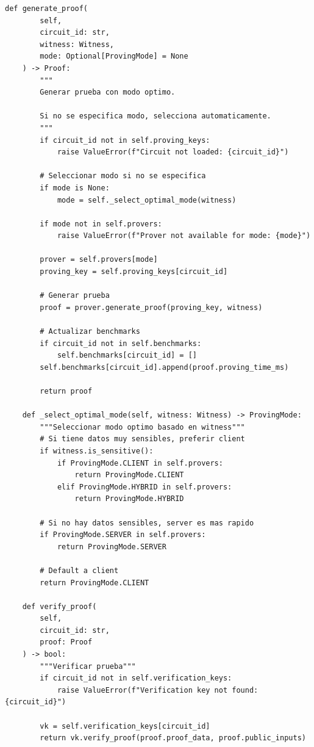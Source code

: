 \documentclass[11pt,a4paper,twoside]{book}
\theoremstyle{definition}
\theoremstyle{remark}
\begin{document}
\begin{lstlisting}[style=python, caption={Infraestructura de proving ZK}]
    def generate_proof(
        self,
        circuit_id: str,
        witness: Witness,
        mode: Optional[ProvingMode] = None
    ) -> Proof:
        """
        Generar prueba con modo optimo.
        
        Si no se especifica modo, selecciona automaticamente.
        """
        if circuit_id not in self.proving_keys:
            raise ValueError(f"Circuit not loaded: {circuit_id}")
        
        # Seleccionar modo si no se especifica
        if mode is None:
            mode = self._select_optimal_mode(witness)
        
        if mode not in self.provers:
            raise ValueError(f"Prover not available for mode: {mode}")
        
        prover = self.provers[mode]
        proving_key = self.proving_keys[circuit_id]
        
        # Generar prueba
        proof = prover.generate_proof(proving_key, witness)
        
        # Actualizar benchmarks
        if circuit_id not in self.benchmarks:
            self.benchmarks[circuit_id] = []
        self.benchmarks[circuit_id].append(proof.proving_time_ms)
        
        return proof
    
    def _select_optimal_mode(self, witness: Witness) -> ProvingMode:
        """Seleccionar modo optimo basado en witness"""
        # Si tiene datos muy sensibles, preferir client
        if witness.is_sensitive():
            if ProvingMode.CLIENT in self.provers:
                return ProvingMode.CLIENT
            elif ProvingMode.HYBRID in self.provers:
                return ProvingMode.HYBRID
        
        # Si no hay datos sensibles, server es mas rapido
        if ProvingMode.SERVER in self.provers:
            return ProvingMode.SERVER
        
        # Default a client
        return ProvingMode.CLIENT
    
    def verify_proof(
        self,
        circuit_id: str,
        proof: Proof
    ) -> bool:
        """Verificar prueba"""
        if circuit_id not in self.verification_keys:
            raise ValueError(f"Verification key not found: {circuit_id}")
        
        vk = self.verification_keys[circuit_id]
        return vk.verify_proof(proof.proof_data, proof.public_inputs)
    

\end{lstlisting}
\end{document}
